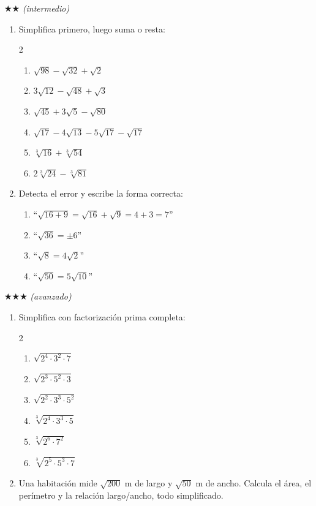 \documentclass[11pt, letterpaper]{article}
\begin{document}
$\bigstar\bigstar$ \textit{(intermedio)}

\begin{enumerate}[label=\textbf{\arabic*.}, leftmargin=*, resume]
  \item Simplifica primero, luego suma o resta:
  \begin{multicols}{2}
  \begin{enumerate}[label=\alph*)]
    \item $\sqrt{98}-\sqrt{32}+\sqrt{2}$
    \item $3\sqrt{12}-\sqrt{48}+\sqrt{3}$
    \item $\sqrt{45}+3\sqrt{5}-\sqrt{80}$
    \item $\sqrt{17}-4\sqrt{13}-5\sqrt{17}-\sqrt{17}$
    \item $\sqrt[3]{16}+\sqrt[3]{54}$
    \item $2\sqrt[3]{24}-\sqrt[3]{81}$
  \end{enumerate}
  \end{multicols}

  \item Detecta el error y escribe la forma correcta:
  \begin{enumerate}[label=\alph*)]
    \item ``$\sqrt{16+9}=\sqrt{16}+\sqrt{9}=4+3=7$''
    \item ``$\sqrt{36}=\pm 6$''
    \item ``$\sqrt{8}=4\sqrt{2}$''
    \item ``$\sqrt{50}=5\sqrt{10}$''
  \end{enumerate}
\end{enumerate}

$\bigstar\bigstar\bigstar$ \textit{(avanzado)}

\begin{enumerate}[label=\textbf{\arabic*.}, leftmargin=*, resume]
  \item Simplifica con factorización prima completa:
  \begin{multicols}{2}
  \begin{enumerate}[label=\alph*)]
    \item $\sqrt{2^4\cdot 3^2\cdot 7}$
    \item $\sqrt{2^3\cdot 5^2\cdot 3}$
    \item $\sqrt{2^2\cdot 3^3\cdot 5^2}$
    \item $\sqrt[3]{2^4\cdot 3^3\cdot 5}$
    \item $\sqrt[3]{2^6\cdot 7^2}$
    \item $\sqrt[3]{2^5\cdot 5^3\cdot 7}$
  \end{enumerate}
  \end{multicols}

  \item Una habitación mide $\sqrt{200}$ m de largo y $\sqrt{50}$ m de ancho. Calcula el área, el perímetro y la relación largo/ancho, todo simplificado.
\end{enumerate}
\end{document}
